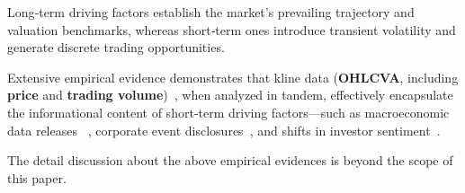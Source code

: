 Long‐term driving factors establish the market’s prevailing trajectory and valuation benchmarks, whereas short‐term ones introduce transient volatility and generate discrete trading opportunities.

Extensive empirical evidence demonstrates that kline data (\textbf{OHLCVA}, including \textbf{price} and \textbf{trading volume})~\cite{kim1991trading}, when analyzed in tandem, effectively encapsulate the informational content of short‐term driving factors—such as macroeconomic data releases ~\cite{flannery2002macroeconomic}, corporate event disclosures~\cite{kim1991trading}, and shifts in investor sentiment~\cite{baker2006investor, da2011search}.



The detail discussion about the above empirical evidences is beyond the scope of this paper.









